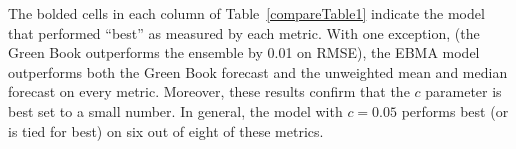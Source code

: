 \documentclass[12pt,fullpage,endnotes]{article}
\begin{document}
The bolded cells in each column of Table~\ref{compareTable1} indicate
the model that performed ``best'' as measured by each metric.  With
one exception, (the Green Book outperforms the ensemble by 0.01 on
RMSE), the EBMA model outperforms both the Green Book forecast and the
unweighted mean and median forecast on every metric.  Moreover, these
results confirm that the $c$ parameter is best set to a small number.
In general, the model with $c=0.05$ performs best (or is tied for
best) on six out of eight of these metrics.








%
%
%
\end{document}
